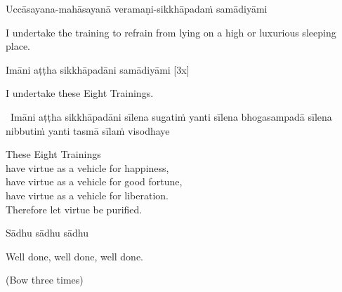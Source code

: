 Uccāsayana-mahāsayanā veramaṇi-sikkhāpadaṁ samādiyāmi

\begin{english-hang}
  I undertake the training to refrain from lying on a high or luxurious sleeping place.
\end{english-hang}

Imāni aṭṭha sikkhāpadāni samādiyāmi \hfill{[3x]}

\begin{english}
  I undertake these Eight Trainings.
\end{english}

\begin{pali-hang}
  \anglebracketleft\ \hspace{-0.5mm}Imāni aṭṭha sikkhāpadāni sīlena sugatiṁ yanti sīlena bhogasampadā sīlena nibbutiṁ yanti tasmā sīlaṁ visodhaye \hspace{-0.5mm}\anglebracketright\
\end{pali-hang}

\begin{english-verses}
  These Eight Trainings\\
  have virtue as a vehicle for happiness,\\
  have virtue as a vehicle for good fortune,\\
  have virtue as a vehicle for liberation.\\
  Therefore let virtue be purified.\hyperlink{endnote144-appendix}{\hypertarget{endnote144-body}{}}
\end{english-verses}

Sādhu sādhu sādhu

\begin{english}
  Well done, well done, well done.
\end{english}

\begin{center}
(Bow three times)
\end{center}

\clearpage
